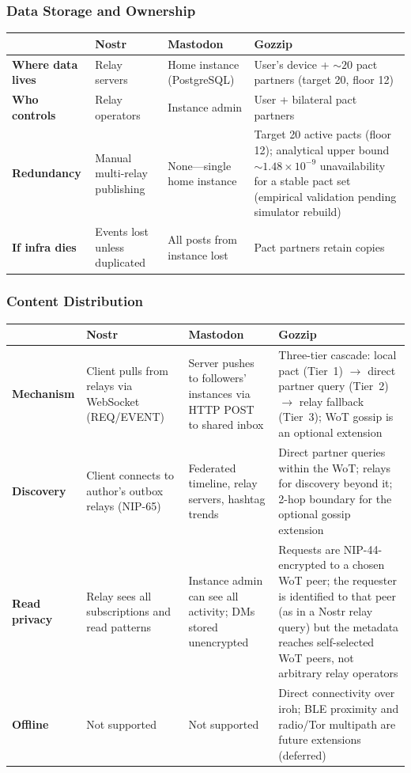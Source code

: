 \documentclass[11pt,a4paper]{article}
\begin{document}
\subsubsection*{Data Storage and Ownership}

\begin{table}[h]
\centering
\small
\begin{tabularx}{\textwidth}{lXXX}
\toprule
 & \textbf{Nostr} & \textbf{Mastodon} & \textbf{Gozzip} \\
\midrule
\textbf{Where data lives} & Relay servers & Home instance (PostgreSQL) & User's device + ${\sim}20$ pact partners (target 20, floor 12) \\
\textbf{Who controls} & Relay operators & Instance admin & User + bilateral pact partners \\
\textbf{Redundancy} & Manual multi-relay publishing & None---single home instance & Target 20 active pacts (floor 12); analytical upper bound ${\sim}1.48\times10^{-9}$ unavailability for a stable pact set (empirical validation pending simulator rebuild) \\
\textbf{If infra dies} & Events lost unless duplicated & All posts from instance lost & Pact partners retain copies \\
\bottomrule
\end{tabularx}
\end{table}

\subsubsection*{Content Distribution}

\begin{table}[H]
\centering
\small
\begin{tabularx}{\textwidth}{lXXX}
\toprule
 & \textbf{Nostr} & \textbf{Mastodon} & \textbf{Gozzip} \\
\midrule
\textbf{Mechanism} & Client pulls from relays via WebSocket (REQ/EVENT) & Server pushes to followers' instances via HTTP POST to shared inbox & Three-tier cascade: local pact (Tier~1) $\to$ direct partner query (Tier~2) $\to$ relay fallback (Tier~3); WoT gossip is an optional extension \\
\textbf{Discovery} & Client connects to author's outbox relays (NIP-65) & Federated timeline, relay servers, hashtag trends & Direct partner queries within the WoT; relays for discovery beyond it; 2-hop boundary for the optional gossip extension \\
\textbf{Read privacy} & Relay sees all subscriptions and read patterns & Instance admin can see all activity; DMs stored unencrypted & Requests are NIP-44-encrypted to a chosen WoT peer; the requester is identified to that peer (as in a Nostr relay query) but the metadata reaches self-selected WoT peers, not arbitrary relay operators \\
\textbf{Offline} & Not supported & Not supported & Direct connectivity over iroh; BLE proximity and radio/Tor multipath are future extensions (deferred) \\
\bottomrule
\end{tabularx}
\end{table}
\end{document}

